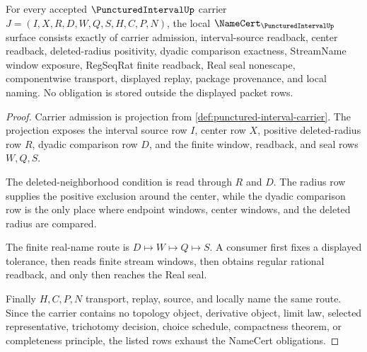 \begin{theorem}\label{thm:punctured-interval-namecert-obligations}
For every accepted $\PuncturedIntervalUp$ carrier $J=(I,X,R,D,W,Q,S,H,C,P,N)$, the local $\NameCert_{\PuncturedIntervalUp}$ surface consists exactly of carrier admission, interval-source readback, center readback, deleted-radius positivity, dyadic comparison exactness, StreamName window exposure, RegSeqRat finite readback, Real seal nonescape, componentwise transport, displayed replay, package provenance, and local naming. No obligation is stored outside the displayed packet rows.
\end{theorem}
\begin{proof}
Carrier admission is projection from \autoref{def:punctured-interval-carrier}. The projection exposes the interval source row $I$, center row $X$, positive deleted-radius row $R$, dyadic comparison row $D$, and the finite window, readback, and seal rows $W,Q,S$.

The deleted-neighborhood condition is read through $R$ and $D$. The radius row supplies the positive exclusion around the center, while the dyadic comparison row is the only place where endpoint windows, center windows, and the deleted radius are compared.

The finite real-name route is $D\mapsto W\mapsto Q\mapsto S$. A consumer first fixes a displayed tolerance, then reads finite stream windows, then obtains regular rational readback, and only then reaches the Real seal.

Finally $H,C,P,N$ transport, replay, source, and locally name the same route. Since the carrier contains no topology object, derivative object, limit law, selected representative, trichotomy decision, choice schedule, compactness theorem, or completeness principle, the listed rows exhaust the NameCert obligations.
\end{proof}

